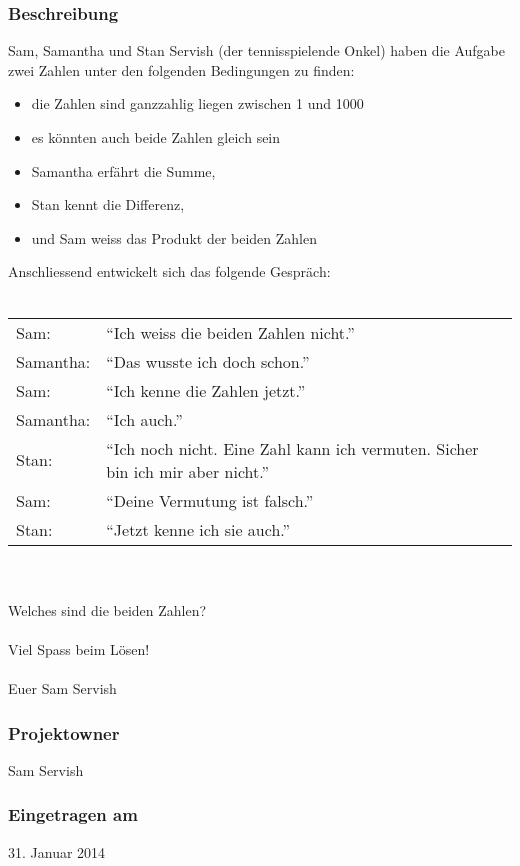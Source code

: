 \documentclass[a4paper, 10pt, fleqn]{article}
\begin{document}
\subsubsection*{Beschreibung}
Sam, Samantha und Stan Servish (der tennisspielende Onkel) haben die Aufgabe 
zwei Zahlen unter den folgenden Bedingungen zu finden:
\begin{itemize}
\item die Zahlen sind ganzzahlig liegen zwischen 1 und 1000
\item es könnten auch beide Zahlen gleich sein
\item Samantha erfährt die Summe,
\item Stan kennt die Differenz,
\item und Sam weiss das Produkt der beiden Zahlen
\end{itemize}
Anschliessend entwickelt sich das folgende Gespräch:
\\\\
\begin{tabular}{ll}
Sam:      & "`Ich weiss die beiden Zahlen nicht."' \\
Samantha: & "`Das wusste ich doch schon."' \\
Sam:      & "`Ich kenne die Zahlen jetzt."' \\
Samantha: & "`Ich auch."' \\
Stan:     & "`Ich noch nicht. Eine Zahl kann ich vermuten. Sicher bin ich mir aber nicht."' \\
Sam:      & "`Deine Vermutung ist falsch."' \\
Stan:     & "`Jetzt kenne ich sie auch."' \\
\end{tabular}
\\\\
Welches sind die beiden Zahlen?
\\\\
Viel Spass beim Lösen!
\\\\
Euer Sam Servish

\subsubsection*{Projektowner}
Sam Servish 

\subsubsection*{Eingetragen am}
31. Januar 2014 \\
\end{document}
